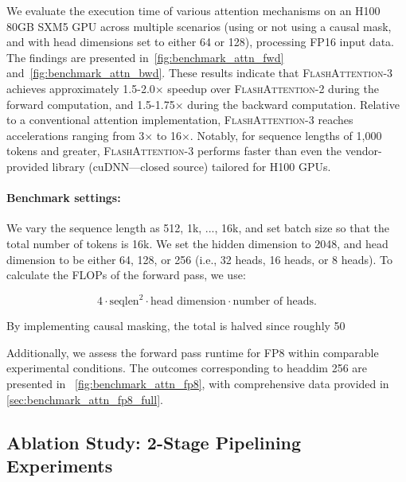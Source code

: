 \begin{algorithm}[H]
\begin{algorithmic}[1]
We evaluate the execution time of various attention mechanisms on an H100 80GB SXM5 GPU across multiple scenarios (using or not using a causal mask, and with head dimensions set to either 64 or 128), processing FP16 input data. The findings are presented in~\cref{fig:benchmark_attn_fwd} and~\cref{fig:benchmark_attn_bwd}. These results indicate that \textsc{FlashAttention-3} achieves approximately 1.5-2.0$\times$ speedup over \textsc{FlashAttention-2} during the forward computation, and 1.5-1.75$\times$ during the backward computation. Relative to a conventional attention implementation, \textsc{FlashAttention-3} reaches accelerations ranging from 3$\times$ to 16$\times$. Notably, for sequence lengths of 1,000 tokens and greater, \textsc{FlashAttention-3} performs faster than even the vendor-provided library (cuDNN—closed source) tailored for H100 GPUs.

\paragraph{Benchmark settings:} We vary the sequence length as 512, 1k, ..., 16k, and set batch size so that the total number of tokens is 16k. We set the hidden dimension to 2048, and head dimension to be either 64, 128, or 256 (i.e., 32 heads, 16 heads, or 8 heads). To calculate the FLOPs of the forward pass, we use:

\begin{equation*}
  4 \cdot \text{seqlen}^2 \cdot \text{head dimension} \cdot \text{number of heads}.
\end{equation*}

By implementing causal masking, the total is halved since roughly 50%

Additionally, we assess the forward pass runtime for FP8 within comparable experimental conditions. The outcomes corresponding to headdim 256 are presented in ~\cref{fig:benchmark_attn_fp8}, with comprehensive data provided in \cref{sec:benchmark_attn_fp8_full}.

\subsection{Ablation Study: 2-Stage Pipelining Experiments}
\label{sec:2-stage-pipelining-experiments}


\end{algorithmic}
\end{algorithm}
